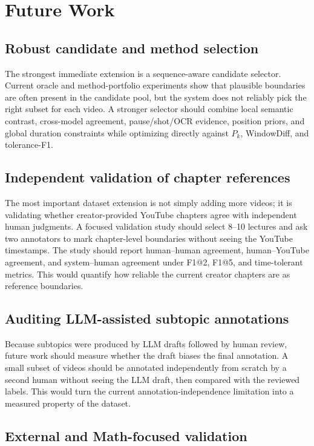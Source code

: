 \chapter{Future Work}
\label{chap:future}

\section{Robust candidate and method selection}

The strongest immediate extension is a sequence-aware candidate selector.
Current oracle and method-portfolio experiments show that plausible boundaries
are often present in the candidate pool, but the system does not reliably pick
the right subset for each video. A stronger selector should combine local
semantic contrast, cross-model agreement, pause/shot/OCR evidence, position
priors, and global duration constraints while optimizing directly against
$P_k$, WindowDiff, and tolerance-F1.

\section{Independent validation of chapter references}

The most important dataset extension is not simply adding more videos; it is
validating whether creator-provided YouTube chapters agree with independent
human judgments. A focused validation study should select 8--10 lectures and
ask two annotators to mark chapter-level boundaries without seeing the YouTube
timestamps. The study should report human--human agreement, human--YouTube
agreement, and system--human agreement under F1@2, F1@5, and time-tolerant
metrics. This would quantify how reliable the current creator chapters are as
reference boundaries.

\section{Auditing LLM-assisted subtopic annotations}

Because subtopics were produced by LLM drafts followed by human review, future
work should measure whether the draft biases the final annotation. A small
subset of videos should be annotated independently from scratch by a second
human without seeing the LLM draft, then compared with the reviewed labels.
This would turn the current annotation-independence limitation into a measured
property of the dataset.

\section{External and Math-focused validation}

